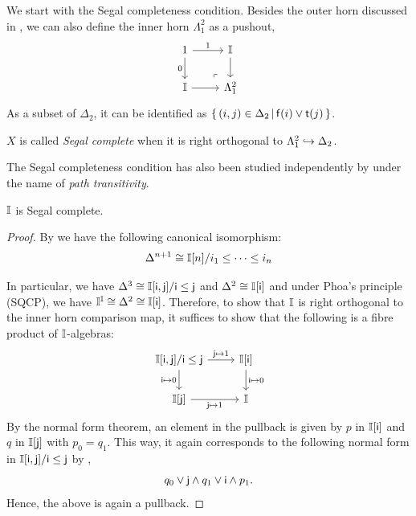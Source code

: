 We start with the Segal completeness condition. Besides the outer horn discussed in , we can also define the inner horn $\Lambda^2_1$ as a pushout,
\[
  \begin{tikzcd}
    1 \ar[d, "0"'] \ar[r, "1"] & \mbb{I} \ar[d] \\
    \mbb{I} \ar[r] & \Lambda^2_1
    \arrow["\lrcorner"{anchor=center, pos=0.125, rotate=180}, draw=none, from=2-2, to=1-1]
  \end{tikzcd}
\]
As a subset of $\Delta_2$, it can be identified as $\left\{\,(i,j) \in \Delta_2\,\middle|\,\mathsf{f}(i) \vee \mathsf{t}(j)\,\right\}$.

\begin{definition}
  $X$ is called \emph{Segal complete} when it is right orthogonal to $\Lambda^2_1 \hookrightarrow \Delta_2$.
\end{definition}

\begin{remark}
  The Segal completeness condition has also been studied independently by \citet{fiore2001domains} under the name of \emph{path transitivity}.
\end{remark}

\begin{proposition}[\AxiomSQCP]
  $\mathbb{I}$ is Segal complete.
\end{proposition}
\begin{proof}
  By  we have the following canonical isomorphism:
  \[ 
    \Delta^{n+1} \cong 
    \mathbb{I}[n]/i_1\leq\cdots\leq i_n
  \]
  
  In particular, we have $\Delta^3\cong \mathbb{I}[\mathsf{i},\mathsf{j}]/\mathsf{i}\leq\mathsf{j}$ and $\Delta^2 \cong \mathbb{I}[\mathsf{i}]$ and under Phoa's principle (SQCP), we have $\mathbb{I}^{\mathbb{I}} \cong \Delta^2\cong\mathbb{I}[\mathsf{i}]$. Therefore, to show that $\mathbb{I}$ is right orthogonal to the inner horn comparison map, it suffices to show that the following is a fibre product of $\mathbb{I}$-algebras:
  \[
  \begin{tikzcd}
    \mbb{I}[\ms{i},\ms{j}]/\ms{i}\le\ms{j} \ar[r, "\ms{j} \mapsto 1"] \ar[d, "\ms{i} \mapsto 0"'] & \mbb{I}[\ms{i}] \ar[d, "\ms{i}\mapsto 0"] \\
    \mbb{I}[\ms{j}] \ar[r, "\ms{j} \mapsto 1"'] & \mbb{I}
  \end{tikzcd}
  \]
  By the normal form theorem, an element in the pullback is given by $p$ in $\mathbb{I}[\mathsf{i}]$ and $q$ in $\mathbb{I}[\mathsf{j}]$ with $p_0 = q_1$. This way, it again corresponds to the following normal form in $\mathbb{I}[\mathsf{i},\mathsf{j}]/\mathsf{i} \le \mathsf{j}$ by ,
  \[ q_0 \vee \mathsf{j} \wedge q_1 \vee \mathsf{i} \wedge p_1\text{.} \]
  Hence, the above is again a pullback.
\end{proof}

